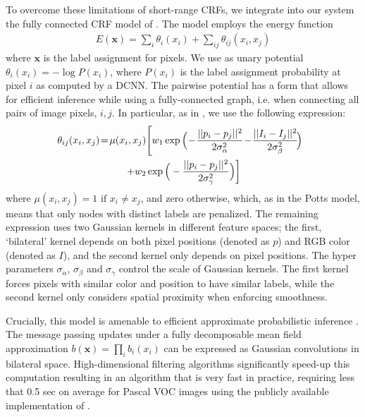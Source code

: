 \documentclass[10pt,journal,compsoc]{IEEEtran}
\begin{document}
To overcome these limitations of short-range CRFs, we integrate into our system
the fully connected CRF model of \cite{krahenbuhl2011efficient}. The model
employs the energy function
\begin{align}
  E(\boldsymbol{x}) = \sum_i \theta_i(x_i) + \sum_{ij} \theta_{ij}(x_i, x_j)
\end{align}
where $\boldsymbol{x}$ is the label assignment for pixels. We use as unary
potential $\theta_i(x_i) = - \log P(x_i)$, where $P(x_i)$ is the label
assignment probability at pixel $i$ as computed by a DCNN. The pairwise
potential has a form that allows for efficient inference while using a fully-connected graph, i.e.
when  connecting 
all pairs of image pixels, $i,j$. In particular, as in \cite{krahenbuhl2011efficient},  we use the following expression:
\begin{gather}
 \hspace{-.2cm}\theta_{ij}(x_i, x_j) \!=\! \mu(x_i,x_j)\!\left[w_1 \exp \Big(\!-\!\frac{||p_i-p_j||^2}{2\sigma_\alpha^2} \!-\!\frac{||I_i-I_j||^2}{2\sigma_\beta^2}\! \Big)\right. \nonumber\\
\left. + w_2 \exp \Big(-\frac{||p_i-p_j||^2}{2\sigma_\gamma^2}\Big)\right]\label{eq:fully_crf}
\end{gather}
where
$\mu(x_i,x_j)= 1 \text{ if } x_i \neq x_j$, and zero otherwise, which, as in the Potts model, means that only nodes with distinct labels are penalized.  The remaining expression uses two Gaussian kernels in different feature spaces; the first, `bilateral' kernel
depends on both pixel positions (denoted as $p$) and
RGB color (denoted as $I$), and the second kernel only depends on pixel
positions. The hyper parameters $\sigma_\alpha$, $\sigma_\beta$ and
$\sigma_\gamma$ control the scale of Gaussian kernels. The  first kernel forces pixels with similar color and position to have similar labels, while the second kernel only considers spatial proximity when enforcing smoothness. 



Crucially, this model is amenable to efficient approximate probabilistic
inference \cite{krahenbuhl2011efficient}. The message passing updates under a
fully decomposable mean field approximation $b(\boldsymbol{x}) = \prod_i
b_i(x_i)$ can be expressed as Gaussian convolutions in bilateral
space. High-dimensional filtering algorithms \cite{adams2010fast}
significantly speed-up this computation resulting in an algorithm that is very
fast in practice, requiring less that 0.5 sec on average for Pascal VOC images using the
publicly available implementation of \cite{krahenbuhl2011efficient}.
\end{document}
